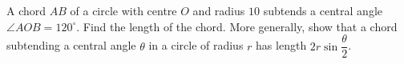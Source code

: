 A chord $AB$ of a circle with centre $O$ and radius $10$ subtends a central angle $\angle AOB=120^\circ$. Find the length of the chord. More generally, show that a chord subtending a central angle $\theta$ in a circle of radius $r$ has length $2r\sin\dfrac{\theta}{2}$.
